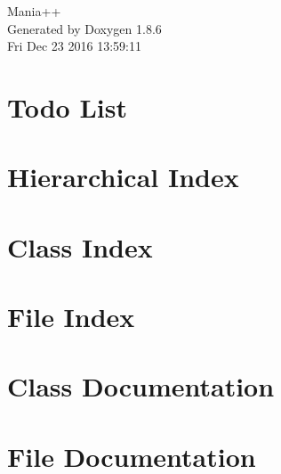 \documentclass[twoside]{book}
\newcommand{\clearemptydoublepage}{%
  \newpage{\pagestyle{empty}\cleardoublepage}%
}
\begin{document}
\hypersetup{pageanchor=false}
\begin{titlepage}
\vspace*{7cm}
\begin{center}%
{\Large Mania++ }\\
\vspace*{1cm}
{\large Generated by Doxygen 1.8.6}\\
\vspace*{0.5cm}
{\small Fri Dec 23 2016 13:59:11}\\
\end{center}
\end{titlepage}
\clearemptydoublepage
\tableofcontents
\clearemptydoublepage
{}
\hypersetup{pageanchor=true}

\chapter{Todo List}
\label{todo}
\hypertarget{todo}{}

\chapter{Hierarchical Index}

\chapter{Class Index}

\chapter{File Index}

\chapter{Class Documentation}



















\chapter{File Documentation}

























\newpage
{}
{}
\printindex
\end{document}
